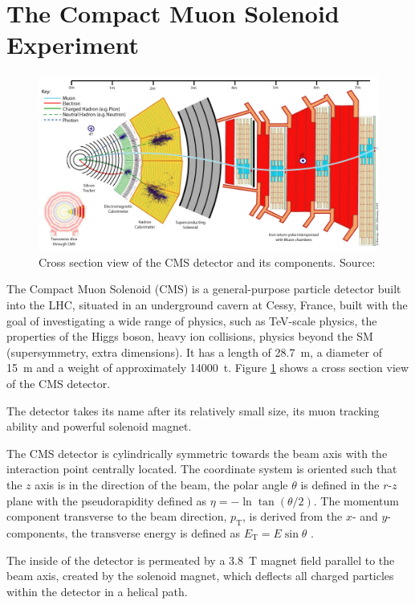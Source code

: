 \section{The Compact Muon Solenoid Experiment}
\begin{figure}[!b]
    \centering
    \includegraphics[width=15cm]{assets/chap02/cms.jpeg}
    \caption{Cross section view of the CMS detector and its components. Source: \cite{Davis:2205172}}
    \label{fig:cms}
\end{figure}
The Compact Muon Solenoid (CMS) is a general-purpose particle detector built into the LHC, situated in an underground cavern at Cessy, France, built with the goal of investigating a wide range of physics, such as TeV-scale physics, the properties of the Higgs boson, heavy ion collisions, physics beyond the SM (supersymmetry, extra dimensions). It has a length of \SI{28.7}{m}, a diameter of \SI{15}{m} and a weight of approximately \SI{14000}{t}. Figure \ref{fig:cms} shows a cross section view of the CMS detector.

The detector takes its name after its relatively small size, its muon tracking ability and powerful solenoid magnet.

The CMS detector is cylindrically symmetric towards the beam axis with the interaction point centrally located. The coordinate system is oriented such that the $z$ axis is in the direction of the beam, the polar angle $\theta$ is defined in the $r$-$z$ plane with the pseudorapidity defined as $\eta=-\ln{\tan{(\theta / 2)}}$. The momentum component transverse to the beam direction, $p_{\text{T}}$, is derived from the $x$- and $y$-components, the transverse energy is defined as $E_{\text{T}}=E \sin{\theta}$ \cite{Spannagel2017}.

The inside of the detector is permeated by a \SI{3.8}{T} magnet field parallel to the beam axis, created by the solenoid magnet, which deflects all charged particles within the detector in a helical path.


